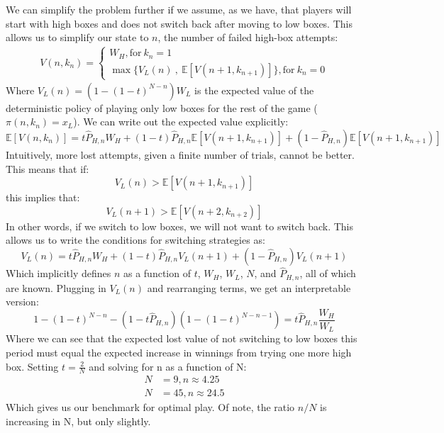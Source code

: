 \documentclass[a4paper,12pt]{article}
\begin{document}
We can simplify the problem further if we assume, as we have, that players will start with high boxes and does not switch back after moving to low boxes. This allows us to simplify our state to $n$, the number of failed high-box attempts:
\begin{align*}
  V(n, k_n) =
 \begin{cases} W_H, \text{for} \ k_n = 1 \\
    \max \bigg\{ V_L(n) \ , \ \mathbb{E}[V(n+1, k_{n+1})]  \bigg\}, \text{for} \ k_n = 0
\end{cases}
\end{align*}
Where $V_L(n) = \left(1 - (1 - t)^{N-n}\right) W_L $ is the expected value of the deterministic policy of playing only low boxes for the rest of the game ($\pi(n, k_n) = x_L$). We can write out the expected value explicitly:
$$
\mathbb{E}[V(n, k_{n})] = t \hat{P}_{H,n} W_H + (1-t)\hat{P}_{H,n}\mathbb{E}[V(n+1, k_{n+1})]+ (1 - \hat{P}_{H,n}) \mathbb{E}[V(n+1, k_{n+1})]
$$
Intuitively, more lost attempts, given a finite number of trials, cannot be better. This means that if:
$$
V_L(n) > \mathbb{E}[V(n+1, k_{n+1})]
$$
this implies that:
$$
V_L(n + 1) > \mathbb{E}[V(n+2, k_{n+2})]
$$
In other words, if we switch to low boxes, we will not want to switch back. This allows us to write the conditions for switching strategies as:
$$
V_L(n) = t \hat{P}_{H,n} W_H + (1-t)\hat{P}_{H,n}V_L(n + 1)+ (1 - \hat{P}_{H,n}) V_L(n + 1)
$$
Which implicitly defines $n$ as a function of $t$, $W_H$, $W_L$, $N$, and $\hat{P}_{H,n}$, all of which are known. Plugging in $V_L(n)$ and rearranging terms, we get an interpretable version:
$$
1 - (1 - t)^{N-n} - (1 - t \hat{P}_{H,n}) \left(1 - (1 - t)^{N-n-1}\right) = t \hat{P}_{H,n} \frac{W_H}{W_L}
$$
Where we can see that the expected lost value of not switching to low boxes this period must equal the expected increase in winnings from trying one more high box. Setting $t = \frac{2}{N}$ and solving for n as a function of N:
\begin{align*}
  N &= 9, n \approx 4.25 \\
  N &= 45, n \approx 24.5
\end{align*}
Which gives us our benchmark for optimal play. Of note, the ratio $n/N$ is increasing in N, but only slightly.
\end{document}
